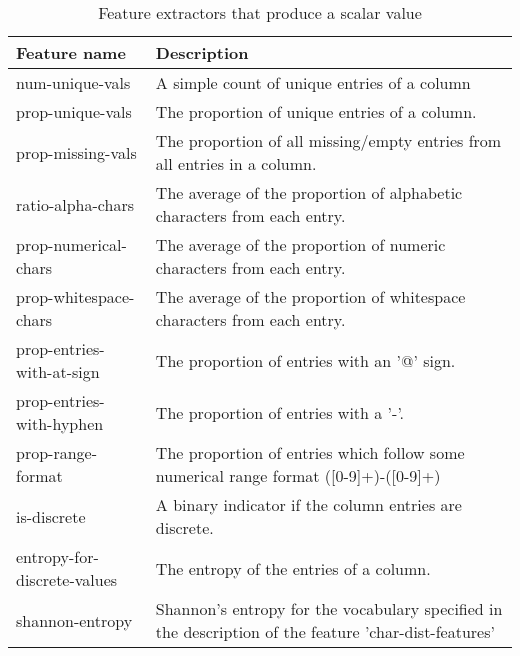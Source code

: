 \documentclass[letterpaper]{article} %
\begin{document}
\begin{table}[h]
	\centering
	\caption{Feature extractors that produce a scalar value}
	\begin{tabular}{p{3cm}p{4.5cm}}
	Feature name & Description \\ \hline
	num-unique-vals & A simple count of unique entries of a column\\
	\rowcolor{Gray}
	prop-unique-vals & The proportion of unique entries of a column. \\
	\rowcolor{Gray}
	prop-missing-vals & The proportion of all missing/empty entries from all entries in a column.\\
	ratio-alpha-chars & The average of the proportion of alphabetic characters from each entry.\\
	\rowcolor{Gray}
	prop-numerical-chars & The average of the proportion of numeric characters from each entry.\\
	prop-whitespace-chars    & The average of the proportion of whitespace characters from each entry.\\
	\rowcolor{Gray}
	prop-entries-with-at-sign& The proportion of entries with an '@' sign. \\
	prop-entries-with-hyphen & The proportion of entries with a '-'. \\
	\rowcolor{Gray}
	prop-range-format        & The proportion of entries which follow some numerical range format   ([0-9]+)-([0-9]+) \\
	is-discrete              & A binary indicator if the column entries are discrete. \\
	\rowcolor{Gray}
	entropy-for-discrete-values & The entropy of the entries of a column.\\
	shannon-entropy          & Shannon's entropy for the vocabulary specified in the description of the feature 'char-dist-features'\\
	\end{tabular}
	\vspace*{-3mm}
\end{table}
\end{document}
